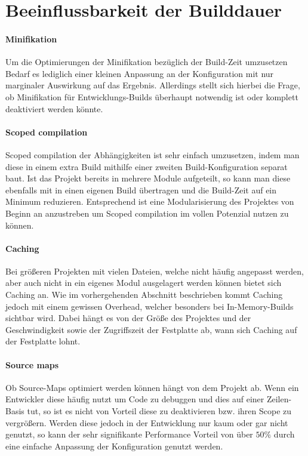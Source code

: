 \documentclass[11pt]{report}
\begin{document}
		
		\section{Beeinflussbarkeit der Builddauer}
			\paragraph{Minifikation} Um die Optimierungen der Minifikation bezüglich der Build-Zeit umzusetzen Bedarf es lediglich einer kleinen Anpassung an der Konfiguration mit nur marginaler Auswirkung auf das Ergebnis. Allerdings stellt sich hierbei die Frage, ob Minifikation für Entwicklungs-Builds überhaupt notwendig ist oder komplett deaktiviert werden könnte. 
			\paragraph{Scoped compilation} Scoped compilation der Abhängigkeiten ist sehr einfach umzusetzen, indem man diese in einem extra Build mithilfe einer zweiten Build-Konfiguration separat baut. Ist das Projekt bereits in mehrere Module aufgeteilt, so kann man diese ebenfalls mit in einen eigenen Build übertragen und die Build-Zeit auf ein Minimum reduzieren. Entsprechend ist eine Modularisierung des Projektes von Beginn an anzustreben um Scoped compilation im vollen Potenzial nutzen zu können.
			\paragraph{Caching} Bei größeren Projekten mit vielen Dateien, welche nicht häufig angepasst werden, aber auch nicht in ein eigenes Modul ausgelagert werden können bietet sich Caching an. Wie im vorhergehenden Abschnitt beschrieben kommt Caching jedoch mit einem gewissen Overhead, welcher besonders bei In-Memory-Builds sichtbar wird. Dabei hängt es von der Größe des Projektes und der Geschwindigkeit sowie der Zugriffszeit der Festplatte ab, wann sich Caching auf der Festplatte lohnt.
			\paragraph{Source maps} Ob Source-Maps optimiert werden können hängt von dem Projekt ab. Wenn ein Entwickler diese häufig nutzt um Code zu debuggen und dies auf einer Zeilen-Basis tut, so ist es nicht von Vorteil diese zu deaktivieren bzw. ihren Scope zu vergrößern. Werden diese jedoch in der Entwicklung nur kaum oder gar nicht genutzt, so kann der sehr signifikante Performance Vorteil von über $50 \%$ durch eine einfache Anpassung der Konfiguration genutzt werden.
\end{document}
